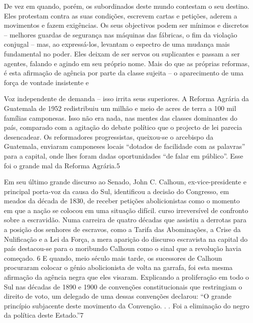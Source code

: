  \par 
De vez em quando, porém, os subordinados deste mundo contestam o seu destino. Eles protestam contra as suas condições, escrevem cartas e petições, aderem a movimentos e fazem exigências. Os seus objectivos podem ser mínimos e discretos – melhores guardas de segurança nas máquinas das fábricas, o fim da violação conjugal – mas, ao expressá-los, levantam o espectro de uma mudança mais fundamental no poder. Eles deixam de ser servos ou suplicantes e passam a ser agentes, falando e agindo em seu próprio nome. Mais do que as próprias reformas, é esta afirmação de agência por parte da classe sujeita – o aparecimento de uma força de vontade insistente e
 \par 
Voz independente de demanda – isso irrita seus superiores. A Reforma Agrária da Guatemala de 1952 redistribuiu um milhão e meio de acres de terra a {\color{blue}100} mil famílias camponesas. Isso não era nada, nas mentes das classes dominantes do país, comparado com a agitação do debate político que o projecto de lei parecia desencadear. Os reformadores progressistas, queixou-se o arcebispo da Guatemala, enviaram camponeses locais “dotados de facilidade com as palavras” para a capital, onde lhes foram dadas oportunidades “de falar em público”. Esse foi o grande mal da Reforma Agrária.{\color{blue}5}
 \par 
Em seu último grande discurso ao Senado, John C. Calhoun, ex-vice-presidente e principal porta-voz da causa do Sul, identificou a decisão do Congresso, em meados da década de 1830, de receber petições abolicionistas como o momento em que a nação se colocou em uma situação difícil. curso irreversível de confronto sobre a escravidão. Numa carreira de quatro décadas que assistiu a derrotas para a posição dos senhores de escravos, como a Tarifa das Abominações, a Crise da Nulificação e a Lei da Força, a mera aparição do discurso escravista na capital do país destacou-se para o moribundo Calhoun como o sinal que a revolução havia começado. {\color{blue}6} E quando, meio século mais tarde, os sucessores de Calhoun procuraram colocar o génio abolicionista de volta na garrafa, foi esta mesma afirmação da agência negra que eles visaram. Explicando a proliferação em todo o Sul nas décadas de 1890 e 1900 de convenções constitucionais que restringiam o direito de voto, um delegado de uma dessas convenções declarou: “O grande princípio subjacente deste movimento da Convenção. . . Foi a eliminação do negro da política deste Estado.”{\color{blue}7}
 \par 

